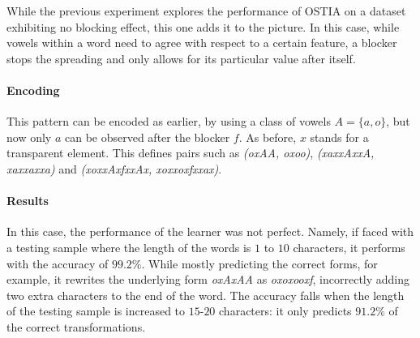While the previous experiment explores the performance of OSTIA on a dataset exhibiting no blocking effect, this one adds it to the picture.
In this case, while vowels within a word need to agree with respect to a certain feature, a blocker stops the spreading and only allows for its particular value after itself.

\paragraph{Encoding}

This pattern can be encoded as earlier, by using a class of vowels $A = \{a, o\}$, but now only $a$ can be observed after the blocker $f$.
As before, $x$ stands for a transparent element.
This defines pairs such as \emph{(oxAA, oxoo)}, \emph{(xaxxAxxA, xaxxaxxa)} and \emph{(xoxxAxfxxAx, xoxxoxfxxax)}.

\paragraph{Results}
In this case, the performance of the learner was not perfect.
Namely, if faced with a testing sample where the length of the words is $1$ to $10$ characters, it performs with the accuracy of $99.2$\%.
While mostly predicting the correct forms, for example, it rewrites the underlying form \emph{oxAxAA} as \emph{oxoxooxf}, incorrectly adding two extra characters to the end of the word.
The accuracy falls when the length of the testing sample is increased to $15$-$20$ characters: it only predicts $91.2$\% of the correct transformations.

\begin{table}[h!]
\centering
{}
\caption{Results of OSTIA learning a single vowel harmony with blocking.}
\end{table}


